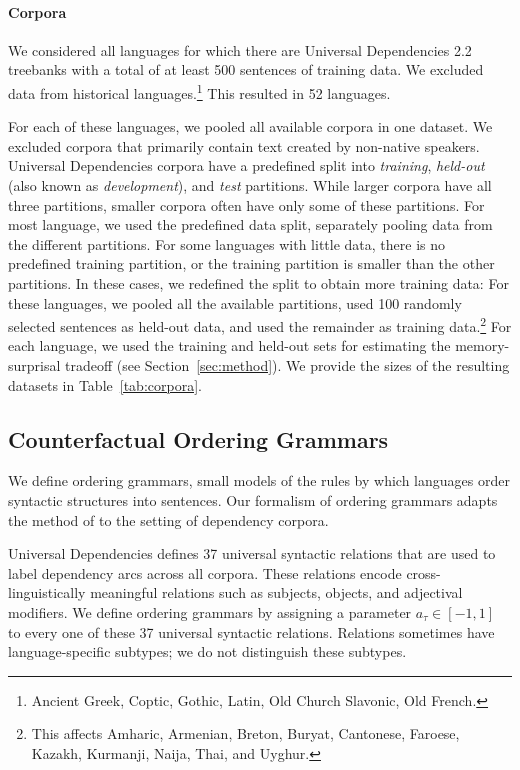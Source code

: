 \documentclass[11pt,letterpaper]{article}
\begin{document}
\paragraph{Corpora}
We considered all languages for which there are Universal Dependencies 2.2 treebanks with a total of at least 500 sentences of training data.
We excluded data from historical languages.\footnote{Ancient Greek, Coptic, Gothic, Latin, Old Church Slavonic, Old French.}
This resulted in 52 languages.

For each of these languages, we pooled all available corpora in one dataset.
We excluded corpora that primarily contain text created by non-native speakers.
Universal Dependencies corpora have a predefined split into \emph{training}, \emph{held-out} (also known as \emph{development}), and \emph{test} partitions.
While larger corpora have all three partitions, smaller corpora often have only some of these partitions.
For most language, we used the predefined data split, separately pooling data from the different partitions. %
For some languages with little data, there is no predefined training partition, or the training partition is smaller than the other partitions.
In these cases, we redefined the split to obtain more training data:
For these languages, we pooled all the available partitions, used 100 randomly selected sentences as held-out data, and used the remainder as training data.\footnote{This affects Amharic, Armenian, Breton, Buryat, Cantonese, Faroese, Kazakh, Kurmanji, Naija, Thai, and Uyghur.}
For each language, we used the training and held-out sets for estimating the memory-surprisal tradeoff (see Section~\ref{sec:method}).
We provide the sizes of the resulting datasets in Table~\ref{tab:corpora}.



\subsection{Counterfactual Ordering Grammars}
We define ordering grammars, small models of the rules by which languages order syntactic structures into sentences.
Our formalism of ordering grammars adapts the method of \cite{gildea-optimizing-2007, gildea-grammars-2010, gildea-human-2015} to the setting of dependency corpora.

Universal Dependencies defines 37 universal syntactic relations that are used to label dependency arcs across all corpora.
These relations encode cross-linguistically meaningful relations such as subjects, objects, and adjectival modifiers.
We define ordering grammars by assigning a parameter $a_\tau \in [-1,1]$ to every one of these 37 universal syntactic relations.
Relations sometimes have language-specific subtypes; we do not distinguish these subtypes.
\end{document}
